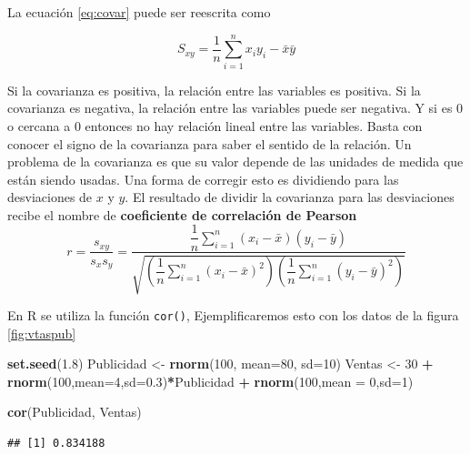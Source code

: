 \documentclass[letterpaper,]{book}
\newenvironment{Shaded}{\begin{snugshade}}{\end{snugshade}}
\newcommand{\DataTypeTok}[1]{\textcolor[rgb]{0.13,0.29,0.53}{#1}}
\newcommand{\DecValTok}[1]{\textcolor[rgb]{0.00,0.00,0.81}{#1}}
\newcommand{\FloatTok}[1]{\textcolor[rgb]{0.00,0.00,0.81}{#1}}
\newcommand{\KeywordTok}[1]{\textcolor[rgb]{0.13,0.29,0.53}{\textbf{#1}}}
\newcommand{\NormalTok}[1]{#1}
\newcommand{\OperatorTok}[1]{\textcolor[rgb]{0.81,0.36,0.00}{\textbf{#1}}}
\newcommand{\StringTok}[1]{\textcolor[rgb]{0.31,0.60,0.02}{#1}}
\begin{document}
La ecuación \eqref{eq:covar} puede ser reescrita como

\begin{equation} 
  S_{xy} = \dfrac{1}{n}\sum_{i=1}^{n}{x_iy_i}-\bar{x}\bar{y}
  \label{eq:covar2}
\end{equation}

Si la covarianza es positiva, la relación entre las variables es positiva. Si la covarianza es negativa, la relación entre las variables puede ser negativa. Y si es \(0\) o cercana a \(0\) entonces no hay relación lineal entre las variables. Basta con conocer el signo de la covarianza para saber el sentido de la relación. Un problema de la covarianza es que su valor depende de las unidades de medida que están siendo usadas. Una forma de corregir esto es dividiendo para las desviaciones de \(x\) y \(y\). El resultado de dividir la covarianza para las desviaciones recibe el nombre de \textbf{coeficiente de correlación de Pearson}
\begin{equation} 
  r=\dfrac{s_{xy}}{s_xs_y}=\dfrac{\dfrac{1}{n} \sum_{i=1}^{n}\left(x_i-\bar{x}\right)\left(y_i-\bar{y}\right)}{\sqrt{\left(\dfrac{1}{n} \sum_{i=1}^{n}\left(x_i-\bar{x}\right)^2\right)\left(\dfrac{1}{n} \sum_{i=1}^{n}\left(y_i-\bar{y}\right)^2\right)}}
  \label{eq:covar3}
\end{equation}

En R se utiliza la función \texttt{cor()}, Ejemplificaremos esto con los datos de la figura \ref{fig:vtaspub}

\begin{Shaded}
\begin{Highlighting}[]
\KeywordTok{set.seed}\NormalTok{(}\FloatTok{1.8}\NormalTok{)}
\NormalTok{Publicidad <-}\StringTok{ }\KeywordTok{rnorm}\NormalTok{(}\DecValTok{100}\NormalTok{, }\DataTypeTok{mean=}\DecValTok{80}\NormalTok{, }\DataTypeTok{sd=}\DecValTok{10}\NormalTok{)}
\NormalTok{Ventas <-}\StringTok{ }\DecValTok{30} \OperatorTok{+}\StringTok{ }\KeywordTok{rnorm}\NormalTok{(}\DecValTok{100}\NormalTok{,}\DataTypeTok{mean=}\DecValTok{4}\NormalTok{,}\DataTypeTok{sd=}\FloatTok{0.3}\NormalTok{)}\OperatorTok{*}\NormalTok{Publicidad }\OperatorTok{+}\StringTok{ }\KeywordTok{rnorm}\NormalTok{(}\DecValTok{100}\NormalTok{,}\DataTypeTok{mean =} \DecValTok{0}\NormalTok{,}\DataTypeTok{sd=}\DecValTok{1}\NormalTok{)}

\KeywordTok{cor}\NormalTok{(Publicidad, Ventas)}
\end{Highlighting}
\end{Shaded}

\begin{verbatim}
## [1] 0.834188
\end{verbatim}
\end{document}

